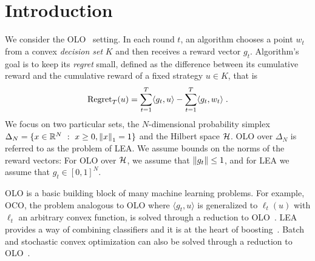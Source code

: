 \section{Introduction}
\label{section:introduction}

\vspace{-0.2cm}

We consider the \ac{OLO}~\cite{Cesa-Bianchi-Lugosi-2006, Shalev-Shwartz-2011}
setting. In each round $t$, an algorithm chooses a point $w_t$ from a convex
\emph{decision set} $K$ and then receives a reward vector $g_t$. Algorithm's
goal is to keep its \emph{regret} small, defined as the difference between its
cumulative reward and the cumulative reward of a fixed strategy $u \in K$, that
is
\vspace{-.1cm}
\[
\operatorname{Regret}_T(u) = \sum_{t=1}^T \langle g_t, u \rangle - \sum_{t=1}^T \langle g_t, w_t \rangle \; .
\]
We focus on two particular sets, the $N$-dimensional probability simplex
$\Delta_N = \{ x \in \mathbb{R}^N ~:~ x \ge 0, \left\|{x}\right\|_1 = 1\}$ and the Hilbert space
$\mathcal{H}$.  \ac{OLO} over $\Delta_N$ is referred to as the problem of \ac{LEA}.  We
assume bounds on the norms of the reward vectors: For \ac{OLO} over $\mathcal{H}$, we
assume that $\left\|{g_t}\right\| \le 1$, and for \ac{LEA} we assume that $g_t \in
[0,1]^N$.

\ac{OLO} is a basic building block of many machine learning problems. For
example, \ac{OCO}, the problem analogous to \ac{OLO} where $\langle g_t, u
\rangle$ is generalized to $\ell_t(u)$ with $\ell_t$ an arbitrary convex
function, is solved through a reduction to \ac{OLO}~\cite{Shalev-Shwartz-2011}.
\ac{LEA}~\cite{Littlestone-Warmuth-1994, Vovk-1998,
Cesa-Bianchi-Freund-Haussler-Helmbold-Schapire-Warmuth-1997} provides a way of
combining classifiers and it is at the heart of
boosting~\cite{Freund-Schapire-1997}. Batch and stochastic convex optimization
can also be solved through a reduction to \ac{OLO}~\cite{Shalev-Shwartz-2011}.

